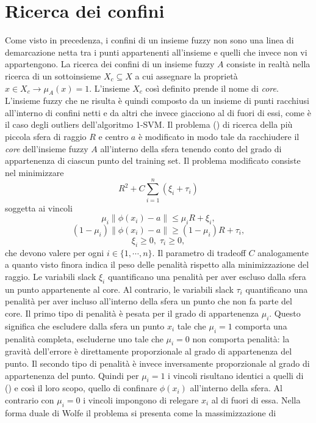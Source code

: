 \documentclass [11pt,a4paper,twoside,openright] {book}
\begin{document}
\section{Ricerca dei confini}
Come visto in precedenza, i confini di un insieme fuzzy non sono una linea di demarcazione netta tra i punti appartenenti all'insieme e quelli che invece non vi appartengono. La ricerca dei confini di un insieme fuzzy $A$ consiste in realtà nella ricerca di un sottoinsieme $X_c \subseteq X$ a cui assegnare la proprietà $x \in X_c \rightarrow \mu_A(x) = 1$. L'insieme $X_c$ così definito prende il nome di \textit{core}. L'insieme fuzzy che ne risulta è quindi composto da un insieme di punti racchiusi all'interno di confini netti e da altri che invece giacciono al di fuori di essi, come è il caso degli outliers dell'algoritmo 1-SVM. Il problema () di ricerca della più piccola sfera di raggio $R$ e centro $a$ è modificato in modo tale da racchiudere il \textit{core} dell'insieme fuzzy $A$ all'interno della sfera tenendo conto del grado di appartenenza di ciascun punto del training set. Il problema modificato consiste nel minimizzare
\begin{equation}
R^2 + C\sum_{i=1}^n (\xi_i + \tau_i)
\end{equation}
soggetta ai vincoli
\begin{equation}\label{out}
\mu_i \parallel \phi(x_i) - a \parallel \leq \mu_i R + \xi_i,
\end{equation}
\begin{equation}\label{in}
(1-\mu_i) \parallel \phi(x_i) - a \parallel \geq (1- \mu_i) R + \tau_i,
\end{equation}
\begin{equation}
\xi_i \geq 0,\; \tau_i \geq 0,
\end{equation}
che devono valere per ogni $i \in \lbrace 1, \cdots, n \rbrace$. Il parametro di tradeoff $C$ analogamente a quanto visto finora indica il peso delle penalità rispetto alla minimizzazione del raggio. Le variabili slack $\xi_i$ quantificano una penalità per aver escluso dalla sfera un punto appartenente al core. Al contrario, le variabili slack $\tau_i$ quantificano una penalità per aver incluso all'interno della sfera un punto che non fa parte del core. Il primo tipo di penalità è pesata per il grado di appartenenza $\mu_i$. Questo significa che escludere dalla sfera un punto $x_i$ tale che $\mu_i = 1$ comporta una penalità completa, escluderne uno tale che $\mu_i = 0$ non comporta penalità: la gravità dell'errore è direttamente proporzionale al grado di appartenenza del punto. Il secondo tipo di penalità è invece inversamente proporzionale al grado di appartenenza del punto.  Quindi per $\mu_i = 1$ i vincoli risultano identici a quelli di () e così il loro scopo, quello di confinare $\phi(x_i)$ all'interno della sfera. Al contrario con $\mu_i = 0$ i vincoli impongono di relegare $x_i$ al di fuori di essa. Nella forma duale di Wolfe il problema si presenta come la massimizzazione di
\end{document}
